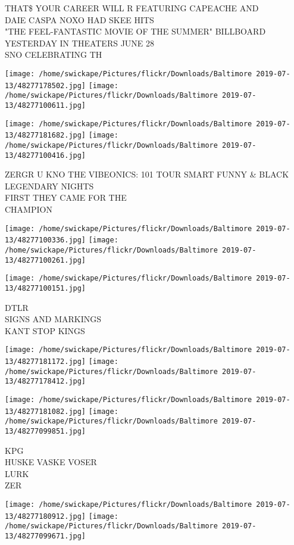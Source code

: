 \documentclass[10pt,letterpaper]{article}
\begin{document}
THAT\$ YOUR CAREER WILL R FEATURING CAPEACHE AND\\
DAIE CASPA NOXO HAD SKEE HITS\\
"THE FEEL{-}FANTASTIC MOVIE OF THE SUMMER" BILLBOARD YESTERDAY IN THEATERS JUNE 28\\
SNO CELEBRATING TH
\pagebreak

\texttt{[image: /home/swickape/Pictures/flickr/Downloads/Baltimore 2019-07-13/48277178502.jpg]}
\texttt{[image: /home/swickape/Pictures/flickr/Downloads/Baltimore 2019-07-13/48277100611.jpg]}

\texttt{[image: /home/swickape/Pictures/flickr/Downloads/Baltimore 2019-07-13/48277181682.jpg]}
\texttt{[image: /home/swickape/Pictures/flickr/Downloads/Baltimore 2019-07-13/48277100416.jpg]}

ZERGR U KNO THE VIBEONICS: 101 TOUR SMART FUNNY \& BLACK\\
LEGENDARY NIGHTS\\
FIRST THEY CAME FOR THE\\
CHAMPION
\pagebreak

\texttt{[image: /home/swickape/Pictures/flickr/Downloads/Baltimore 2019-07-13/48277100336.jpg]}
\texttt{[image: /home/swickape/Pictures/flickr/Downloads/Baltimore 2019-07-13/48277100261.jpg]}

\vspace{0.25in}
\texttt{[image: /home/swickape/Pictures/flickr/Downloads/Baltimore 2019-07-13/48277100151.jpg]}

DTLR\\
SIGNS AND MARKINGS\\
KANT STOP KINGS
\pagebreak

\texttt{[image: /home/swickape/Pictures/flickr/Downloads/Baltimore 2019-07-13/48277181172.jpg]}
\texttt{[image: /home/swickape/Pictures/flickr/Downloads/Baltimore 2019-07-13/48277178412.jpg]}

\texttt{[image: /home/swickape/Pictures/flickr/Downloads/Baltimore 2019-07-13/48277181082.jpg]}
\texttt{[image: /home/swickape/Pictures/flickr/Downloads/Baltimore 2019-07-13/48277099851.jpg]}

KPG\\
HUSKE VASKE VOSER\\
LURK\\
ZER
\pagebreak

\texttt{[image: /home/swickape/Pictures/flickr/Downloads/Baltimore 2019-07-13/48277180912.jpg]}
\texttt{[image: /home/swickape/Pictures/flickr/Downloads/Baltimore 2019-07-13/48277099671.jpg]}
\end{document}
